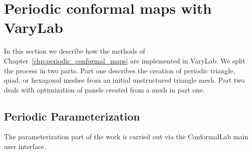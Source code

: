 \documentclass[Thesis.tex]{subfiles}
\begin{document}
\section{Periodic conformal maps with {\sc VaryLab}}
In this section we describe how the methods of Chapter~\ref{chp:periodic_conformal_maps} are implemented in {\sc VaryLab}. We split the process in two parts. Part one describes the creation of periodic triangle, quad, or hexagonal meshes from an initial unstructured triangle mesh. Part two deals with optimization of panels created from a mesh in part one.

\subsection{Periodic Parameterization}
The parameterization part of the work is carried out via the {\sc ConformalLab} main user interface. 
\end{document}
